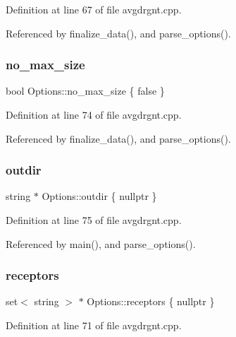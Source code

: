 Definition at line 67 of file avgdrgnt.\+cpp.



Referenced by finalize\+\_\+data(), and parse\+\_\+options().

\mbox{\label{structOptions_a8ad3707dd08d31b9084188a549126644}} 
\subsubsection{\texorpdfstring{no\+\_\+max\+\_\+size}{no\_max\_size}}
{\footnotesize\ttfamily bool Options\+::no\+\_\+max\+\_\+size \{ false \}}



Definition at line 74 of file avgdrgnt.\+cpp.



Referenced by finalize\+\_\+data(), and parse\+\_\+options().

\mbox{\label{structOptions_a80746ce696086f5fb130d798849d0277}} 
\subsubsection{\texorpdfstring{outdir}{outdir}}
{\footnotesize\ttfamily string $\ast$ Options\+::outdir \{ nullptr \}}



Definition at line 75 of file avgdrgnt.\+cpp.



Referenced by main(), and parse\+\_\+options().

\mbox{\label{structOptions_a4192410864fec99db1eea65c8d8dfb52}} 
\subsubsection{\texorpdfstring{receptors}{receptors}}
{\footnotesize\ttfamily set$<$ string $>$ $\ast$ Options\+::receptors \{ nullptr \}}



Definition at line 71 of file avgdrgnt.\+cpp.



